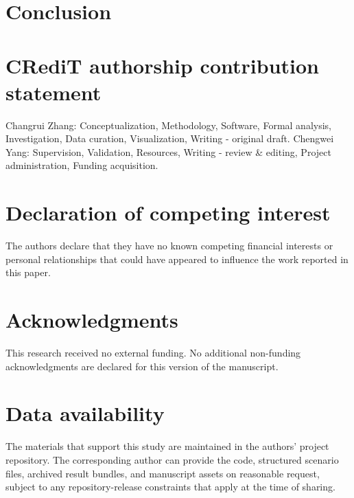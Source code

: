 \documentclass[preprint,12pt]{elsarticle}
\begin{document}
\section{Conclusion}


\section*{CRediT authorship contribution statement}
Changrui Zhang: Conceptualization, Methodology, Software, Formal analysis, Investigation, Data curation, Visualization, Writing - original draft. Chengwei Yang: Supervision, Validation, Resources, Writing - review \& editing, Project administration, Funding acquisition.

\section*{Declaration of competing interest}
The authors declare that they have no known competing financial interests or personal relationships that could have appeared to influence the work reported in this paper.

\section*{Acknowledgments}
This research received no external funding. No additional non-funding acknowledgments are declared for this version of the manuscript.

\section*{Data availability}
The materials that support this study are maintained in the authors' project repository. The corresponding author can provide the code, structured scenario files, archived result bundles, and manuscript assets on reasonable request, subject to any repository-release constraints that apply at the time of sharing.


{\sloppy}
\end{document}
